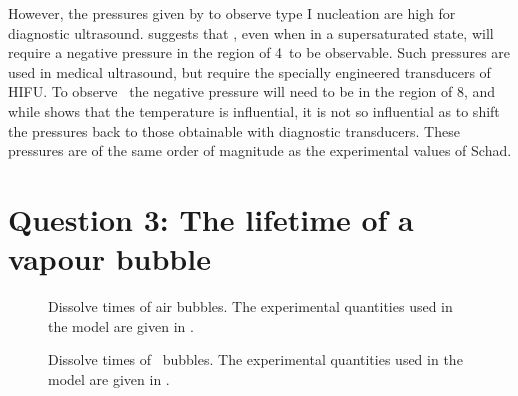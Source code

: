 However, the pressures given by   to observe type I nucleation are high for diagnostic ultrasound.
 suggests that  \pfb, even when in a supersaturated state,
will  require a negative pressure in the region of \unit{4}\mega\pascal\ to be observable. 
Such pressures are used in medical ultrasound, but require the specially engineered transducers of HIFU.
To observe \pfp\ the negative pressure will need to be in the region of \unit{8}\mega\pascal,
and while  shows that the temperature is influential, 
it is not so influential as to shift the pressures back to those obtainable with diagnostic transducers.
These pressures are of the same order of magnitude as the experimental values of Schad\cite{Schad2009}.




\section{Question 3: The lifetime of a vapour bubble}\label{sec:nuc:lifetime}


\begin{figure}
  \subfloat[Dissolution of a \unit{1}\micro\metre\ air bubble when $\zeta=0$]{ \label{fig:nuc:dissolve_time_lum}}
  \caption{ Dissolve times of air bubbles.  The experimental quantities used in the model are given in .}
\end{figure}

\begin{figure}
  \subfloat[Dissolution of a \unit{1}\micro\metre\ \pfp\ bubble when $\zeta=0$]{\label{fig:nuc:dissolve_time_lumPFP}}
  \caption{ Dissolve times of \pfp\ bubbles.  The experimental quantities used in the model are given in . }
 \label{fig:nuc:dissolve_time_lum}
\end{figure}


